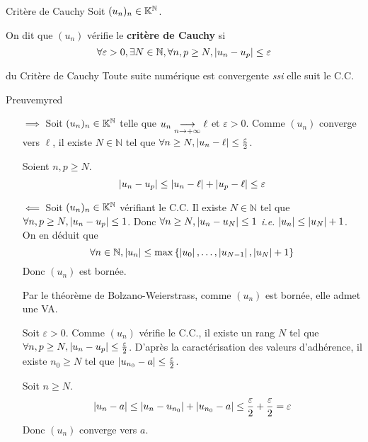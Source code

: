     \begin{defi}{Critère de Cauchy}{}
        Soit $(u_n)_n \in \mathbb{K}^{\mathbb{N}}$.

        On dit que $(u_n)$ vérifie le \textbf{critère de Cauchy} si 
        \[ \forall \varepsilon > 0, \exists N \in \mathbb{N}, \forall n,p \geq N, \left\lvert u_n - u_p\right\rvert \leq \varepsilon \]
    \end{defi}

    \begin{theo}{du Critère de Cauchy}{}
        Toute suite numérique est convergente \textit{ssi} elle suit le C.C.
    \end{theo}

    \begin{demo}{Preuve}{myred}
        \begin{itemize}
            \item[\textcolor{myred}{$\implies$}] Soit $(u_n)_n \in \mathbb{K}^{\mathbb{N}}$ telle que $u_n \underset{n \rightarrow +\infty}{\longrightarrow} \ell$ et $\varepsilon > 0$. Comme $(u_n)$ converge vers $\ell$, il existe $N \in \mathbb{N}$ tel que $\forall n \geq N, \left\lvert u_n - \ell\right\rvert \leq \frac{\varepsilon}{2}$. 
        
            Soient $n,p \geq N$.
            \[ \left\lvert u_n - u_p\right\rvert \leq \left\lvert u_n - \ell\right\rvert + \left\lvert u_p - \ell\right\rvert \leq \varepsilon \] 
            \item[\textcolor{myred}{$\impliedby$}] Soit $(u_n)_n \in \mathbb{K}^{\mathbb{N}}$ vérifiant le C.C. Il existe $N \in \mathbb{N}$ tel que $\forall n,p \geq N, \left\lvert u_n - u_p\right\rvert \leq 1$. Donc $\forall n \geq N, \left\lvert u_n - u_N\right\rvert \leq 1$ \textit{i.e.} $\left\lvert u_n\right\rvert \leq \left\lvert u_N\right\rvert + 1$. On en déduit que 
            \[ \forall n \in \mathbb{N}, \left\lvert u_n\right\rvert \leq \max\left\{ \left\lvert u_0\right\rvert, \ldots, \left\lvert u_{N-1}\right\rvert, \left\lvert u_N\right\rvert + 1 \right\} \] 
            Donc $(u_n)$ est bornée. 

            Par le théorème de Bolzano-Weierstrass, comme $(u_n)$ est bornée, elle admet une VA.

            Soit $\varepsilon > 0$. Comme $(u_n)$ vérifie le C.C., il existe un rang $N$ tel que $\forall n,p \geq N, \left\lvert u_n - u_p\right\rvert \leq \frac{\varepsilon}{2}$. D’après la caractérisation des valeurs d’adhérence, il existe $n_0 \geq N$ tel que $\left\lvert u_{n_0} - a\right\rvert \leq \frac{\varepsilon}{2}$. 

            Soit $n \geq N$.
            \[ \left\lvert u_n - a\right\rvert \leq \left\lvert u_n - u_{n_0}\right\rvert + \left\lvert u_{n_0} - a\right\rvert \leq \frac{\varepsilon}{2} + \frac{\varepsilon}{2} = \varepsilon \]
            Donc $(u_n)$ converge vers $a$.
        \end{itemize}  
    \end{demo}

